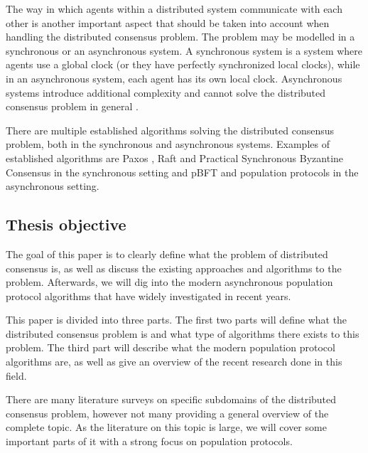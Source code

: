 The way in which agents within a distributed system communicate with each other is another important aspect that should be taken into account when handling the distributed consensus problem. The problem may be modelled in a synchronous or an asynchronous system. A synchronous system is a system where agents use a global clock (or they have perfectly synchronized local clocks), while in an asynchronous system, each agent has its own local clock.  Asynchronous systems introduce additional complexity and cannot solve the distributed consensus problem in general \cite{fischerImpossibilityDistributedConsensus}.

There are multiple established algorithms solving the distributed consensus problem, both in the synchronous and asynchronous systems. Examples of established algorithms are Paxos \cite{lamportFastPaxos2006}, Raft \cite{ongaroSearchUnderstandableConsensus} and Practical Synchronous Byzantine Consensus \cite{renPracticalSynchronousByzantine} in the synchronous setting and pBFT \cite{castroPracticalByzantineFault} and population protocols \cite{aspnesIntroductionPopulationProtocols2009} in the asynchronous setting.


\clearpage

\subsection{Thesis objective}
The goal of this paper is to clearly define what the problem of distributed consensus is, as well as discuss the existing approaches and algorithms to the problem. Afterwards, we will dig into the modern asynchronous population protocol algorithms that have widely investigated in recent years. 

This paper is divided into three parts. The first two parts will define what the distributed consensus problem is and what type of algorithms there exists to this problem. The third part will describe what the modern population protocol algorithms are, as well as give an overview of the recent research done in this field.

There are many literature surveys on specific subdomains of the distributed consensus problem, however not many providing a general overview of the complete topic. As the literature on this topic is large, we will cover some important parts of it with a strong focus on population protocols.
\clearpage